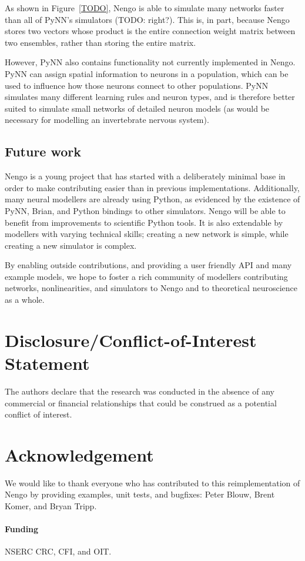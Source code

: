 \documentclass{frontiersSCNS}
\begin{document}
As shown in Figure~\ref{TODO},
Nengo is able to simulate many networks
faster than all of PyNN's simulators
(TODO: right?).
This is, in part, because Nengo stores two vectors
whose product is the entire
connection weight matrix between
two ensembles, rather than storing
the entire matrix.

However, PyNN also contains functionality
not currently implemented in Nengo.
PyNN can assign spatial information
to neurons in a population,
which can be used to influence
how those neurons connect to other populations.
PyNN simulates many different learning rules
and neuron types,
and is therefore better suited to
simulate small networks of detailed neuron models
(as would be necessary for modelling
an invertebrate nervous system).

\subsection{Future work}

Nengo is a young project that
has started with a deliberately minimal base
in order to make contributing easier than in
previous implementations.
Additionally, many neural modellers
are already using Python,
as evidenced by the existence of
PyNN, Brian, and Python bindings to other simulators.
Nengo will be able to benefit
from improvements to scientific Python tools.
It is also extendable by modellers with
varying technical skills;
creating a new network is simple,
while creating a new simulator is complex.

By enabling outside contributions,
and providing a user friendly API
and many example models,
we hope to foster a rich community of modellers
contributing networks, nonlinearities,
and simulators to Nengo
and to theoretical neuroscience
as a whole.

\section*{Disclosure/Conflict-of-Interest Statement}

The authors declare that the research was conducted in the absence of
any commercial or financial relationships that could be construed as a
potential conflict of interest.

\section*{Acknowledgement}

We would like to thank
everyone who has contributed
to this reimplementation of Nengo
by providing examples,
unit tests, and bugfixes:
Peter Blouw, Brent Komer, and Bryan Tripp.

\paragraph{Funding\textcolon}
NSERC CRC, CFI, and OIT.



\end{document}
